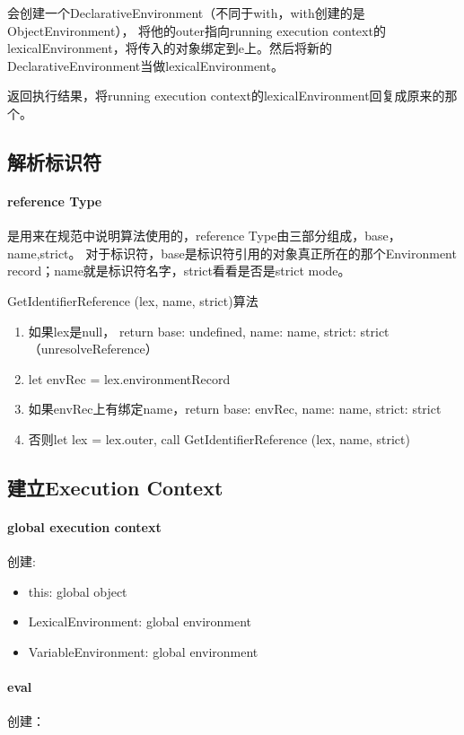 会创建一个DeclarativeEnvironment（不同于with，with创建的是ObjectEnvironment）， 将他的outer指向running execution context的lexicalEnvironment，将传入的对象绑定到e上。然后将新的DeclarativeEnvironment当做lexicalEnvironment。

返回执行结果，将running execution context的lexicalEnvironment回复成原来的那个。
\subsection{解析标识符}
\paragraph{reference Type} 是用来在规范中说明算法使用的，reference Type由三部分组成，base，name,strict。
对于标识符，base是标识符引用的对象真正所在的那个Environment record；name就是标识符名字，strict看看是否是strict mode。

GetIdentifierReference (lex, name, strict)算法
\begin{enumerate}
\item 如果lex是null， return {base: undefined, name: name, strict: strict}（unresolveReference）
\item let envRec = lex.environmentRecord
\item 如果envRec上有绑定name，return {base: envRec, name: name, strict: strict}
\item 否则let lex = lex.outer, call GetIdentifierReference (lex, name, strict)
\end{enumerate}


\subsection{建立Execution Context}
\paragraph{global execution context}
创建:
\begin{itemize}
\item this: global object
\item LexicalEnvironment: global environment
\item VariableEnvironment: global environment
\end{itemize}
\paragraph{eval}
创建：

